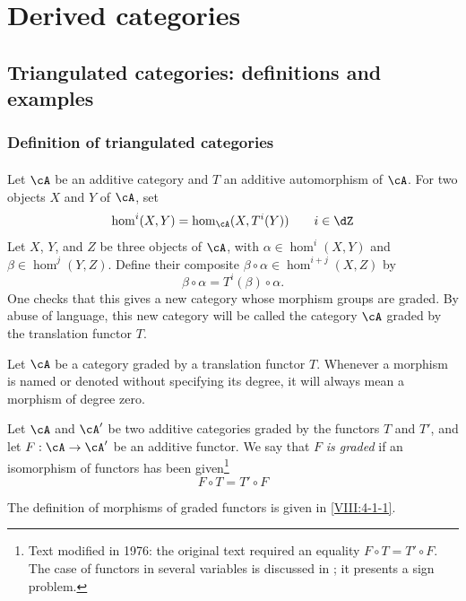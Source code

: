\documentclass[12pt,oneside,english]{smfbook}
\newcommand\blfootnote[1]{%
  \begingroup
  \renewcommand\thefootnote{}%
  \footnotetext{#1}%
  \endgroup
}
\begin{document}
\chapter{Derived categories}\label{VIII}
\blfootnote{by Jean-Louis Verdier}

\section{Triangulated categories: definitions and examples}\label{VIII:1}

\subsection{Definition of triangulated categories}\label{VIII:1-1}

\addtocounter{subsubsection}{-1}
\subsubsection{}\label{VIII:1-1-0}

Let $\cA$ be an additive category and $T$ an additive automorphism of $\cA$. For two objects $X$ and $Y$ of $\cA$, set
\[
  \hom^i(X,Y) = \hom_\cA(X,T^i(Y)) \qquad i\in \dZ
\]
Let $X$, $Y$, and $Z$ be three objects of $\cA$, with $\alpha\in\hom^i(X,Y)$ and $\beta\in\hom^j(Y,Z)$. Define their composite $\beta\circ\alpha\in\hom^{i+j}(X,Z)$ by
\[
  \beta\circ\alpha=T^i(\beta)\circ\alpha .
\]
One checks that this gives a new category whose morphism groups are graded. By abuse of language, this new category will be called the category $\cA$ graded by the translation functor $T$.

Let $\cA$ be a category graded by a translation functor $T$. Whenever a morphism is named or denoted without specifying its degree, it will always mean a morphism of degree zero.

Let $\cA$ and $\cA'$ be two additive categories graded by the functors $T$ and $T'$, and let $F:\cA\to\cA'$ be an additive functor. We say that $F$ \emph{is graded} if an isomorphism of functors has been given\footnote{Text modified in 1976: the original text required an equality $F\circ T=T'\circ F$. The case of functors in several variables is discussed in \cite[XVIII 0.2]{sga4}; it presents a sign problem.}
\[
  F\circ T = T'\circ F
\]

The definition of morphisms of graded functors is given in \ref{VIII:4-1-1}.
\end{document}
